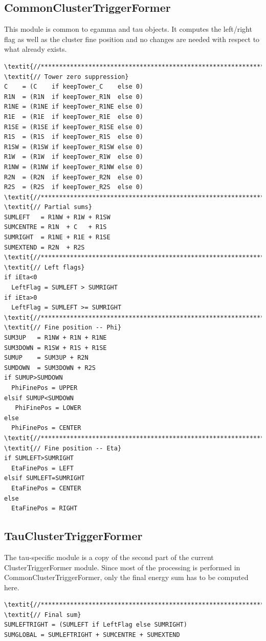 \documentclass[a4paper, 12pt]{article}
\begin{document}
\subsection{CommonClusterTriggerFormer}
This module is common to egamma and tau objects. It computes the left/right flag as well as the cluster fine position and no changes are needed with respect to what already exists.

\begin{Verbatim}[label={Common cluster trigger former}]
\textit{//******************************************************************//}
\textit{// Tower zero suppression}
C    = (C    if keepTower_C    else 0)
R1N  = (R1N  if keepTower_R1N  else 0)
R1NE = (R1NE if keepTower_R1NE else 0)
R1E  = (R1E  if keepTower_R1E  else 0)
R1SE = (R1SE if keepTower_R1SE else 0)
R1S  = (R1S  if keepTower_R1S  else 0)
R1SW = (R1SW if keepTower_R1SW else 0)
R1W  = (R1W  if keepTower_R1W  else 0)
R1NW = (R1NW if keepTower_R1NW else 0)
R2N  = (R2N  if keepTower_R2N  else 0)
R2S  = (R2S  if keepTower_R2S  else 0)
\textit{//******************************************************************//}
\textit{// Partial sums}
SUMLEFT   = R1NW + R1W + R1SW
SUMCENTRE = R1N  + C   + R1S
SUMRIGHT  = R1NE + R1E + R1SE
SUMEXTEND = R2N  + R2S
\textit{//******************************************************************//}
\textit{// Left flags}
if iEta<0
  LeftFlag = SUMLEFT > SUMRIGHT
if iEta>0
  LeftFlag = SUMLEFT >= SUMRIGHT
\textit{//******************************************************************//}
\textit{// Fine position -- Phi}
SUM3UP   = R1NW + R1N + R1NE
SUM3DOWN = R1SW + R1S + R1SE
SUMUP    = SUM3UP + R2N
SUMDOWN  = SUM3DOWN + R2S
if SUMUP>SUMDOWN
  PhiFinePos = UPPER
elsif SUMUP<SUMDOWN
   PhiFinePos = LOWER 
else
  PhiFinePos = CENTER
\textit{//******************************************************************//}
\textit{// Fine position -- Eta}
if SUMLEFT>SUMRIGHT
  EtaFinePos = LEFT
elsif SUMLEFT=SUMRIGHT
  EtaFinePos = CENTER
else
  EtaFinePos = RIGHT
\end{Verbatim}

\subsection{TauClusterTriggerFormer}
The tau-specific module is a copy of the second part of the current ClusterTriggerFormer module. Since most of the processing is performed in CommonClusterTriggerFormer, only the final energy sum has to be computed here.

\begin{Verbatim}[label={Tau cluster trigger former}]
\textit{//******************************************************************//}
\textit{// Final sum}
SUMLEFTRIGHT = (SUMLEFT if LeftFlag else SUMRIGHT)
SUMGLOBAL = SUMLEFTRIGHT + SUMCENTRE + SUMEXTEND
\end{Verbatim}
\end{document}
